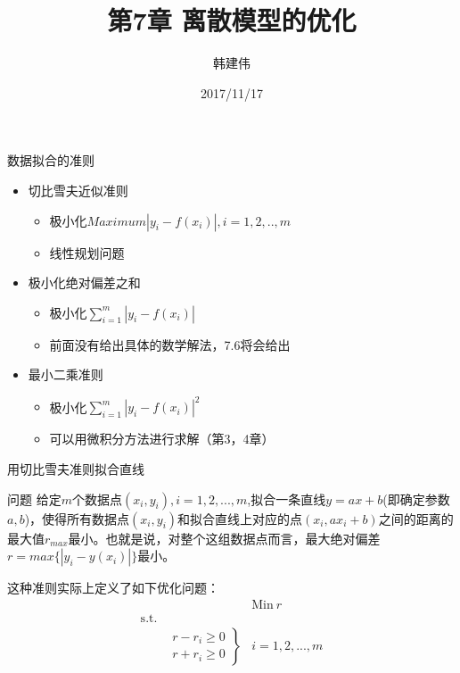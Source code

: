 \documentclass[UTF8]{ctexbeamer}
\title{第7章 离散模型的优化}
\author{韩建伟}
\institute{
  信息学院\\
  \texttt{hanjianwei@zjgsu.edu.cn}
}
\date{2017/11/17}
\begin{document}
\begin{frame}[plain]
  \titlepage{}
\end{frame}

\begin{frame}{数据拟合的准则}

  \begin{itemize}
  \item 切比雪夫近似准则
    \begin{itemize}
    \item 极小化$Maximum |y_i - f(x_i)|,  i = 1, 2, .., m$
    \item 线性规划问题
    \end{itemize}
  \item 极小化绝对偏差之和 
    \begin{itemize}
    \item 极小化$\sum_{i=1}^m |y_i - f(x_i)|$
    \item 前面没有给出具体的数学解法，7.6将会给出
    \end{itemize}
  \item 最小二乘准则 
    \begin{itemize}
    \item 极小化$\sum_{i=1}^m |y_i - f(x_i)|^2$
    \item 可以用微积分方法进行求解（第3，4章）
    \end{itemize}
  \end{itemize}
  
\end{frame}

\begin{frame}{用切比雪夫准则拟合直线}
  \begin{block}{问题}
    给定$m$个数据点$(x_i, y_i), i=1, 2, ..., m$,拟合一条直线$y=ax+b$(即确定参数$a, b$)，使得所有数据点$(x_i, y_i)$和拟合直线上对应的点$(x_i, ax_i+b)$之间的距离的最大值$r_{max}$最小。也就是说，对整个这组数据点而言，最大绝对偏差$r=max\{|y_i-y(x_i)|\}$最小。
  \end{block}

  这种准则实际上定义了如下优化问题：
  \[ 
  \begin{array}{lcl}
    & & \mbox{Min}\ r \\
    \mbox{s.t.} & &  \\
    &
    \left.
      \begin{array}{c}
        r-r_i \ge 0\\
        r+r_i \ge 0
      \end{array}
    \right\}& i = 1, 2, ... , m
  \end{array}
  \]
\end{frame}
\end{document}
